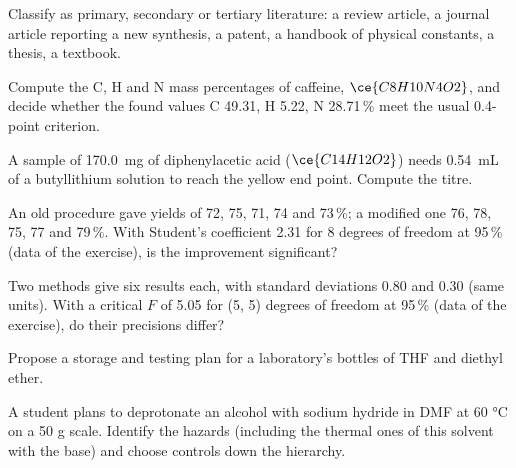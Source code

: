 \begin{exercise}[$\star$]\label{exo:b3:lab-techniques-3:4}
Classify as primary, secondary or tertiary literature: a review article, a
journal article reporting a new synthesis, a patent, a handbook of physical
constants, a thesis, a textbook.
\end{exercise}

\begin{exercise}[$\star\star$]\label{exo:b3:lab-techniques-3:5}
Compute the C, H and N mass percentages of caffeine, $\ce{C8H10N4O2}$, and decide whether the found
values C 49.31, H 5.22, N 28.71\,\% meet the usual 0.4-point criterion.
\end{exercise}

\begin{exercise}[$\star\star$]\label{exo:b3:lab-techniques-3:6}
A sample of \qty{170.0}{mg} of diphenylacetic acid ($\ce{C14H12O2}$) needs \qty{0.54}{mL} of a butyllithium solution to reach
the yellow end point. Compute the titre.
\end{exercise}

\begin{exercise}[$\star\star$]\label{exo:b3:lab-techniques-3:7}
An old procedure gave yields of 72, 75, 71, 74 and 73\,\%; a modified one 76, 78, 75, 77 and
79\,\%. With Student's coefficient 2.31 for 8 degrees of freedom at 95\,\% (data of the exercise),
is the improvement significant?
\end{exercise}

\begin{exercise}[$\star\star$]\label{exo:b3:lab-techniques-3:8}
Two methods give six results each, with standard deviations 0.80 and 0.30 (same
units). With a critical $F$ of 5.05 for (5, 5) degrees of freedom at 95\,\% (data of the
exercise), do their precisions differ?
\end{exercise}

\begin{exercise}[$\star\star$]\label{exo:b3:lab-techniques-3:9}
Propose a storage and testing plan for a laboratory's bottles of THF and diethyl
ether.
\end{exercise}

\begin{exercise}[$\star\star\star$]\label{exo:b3:lab-techniques-3:10}
A student plans to deprotonate an alcohol with sodium hydride in DMF at 60 °C on a
50 g scale. Identify the hazards (including the thermal ones of this solvent with
the base) and choose controls down the hierarchy.
\end{exercise}

